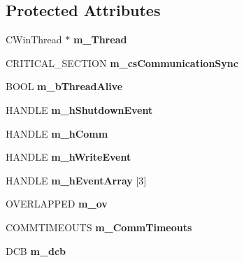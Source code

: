 \subsection*{Protected Attributes}
\begin{DoxyCompactItemize}
\item 
\hypertarget{classCSerialPort_a3c2fe60cefc3c0e14638c132c313bc42}{
CWinThread $\ast$ {\bfseries m\_\-Thread}}
\label{classCSerialPort_a3c2fe60cefc3c0e14638c132c313bc42}

\item 
\hypertarget{classCSerialPort_a3df14df19d8f6f09d803bee2ec0ab25e}{
CRITICAL\_\-SECTION {\bfseries m\_\-csCommunicationSync}}
\label{classCSerialPort_a3df14df19d8f6f09d803bee2ec0ab25e}

\item 
\hypertarget{classCSerialPort_a33f11e4d656ace95dba8f4e8e5890f9f}{
BOOL {\bfseries m\_\-bThreadAlive}}
\label{classCSerialPort_a33f11e4d656ace95dba8f4e8e5890f9f}

\item 
\hypertarget{classCSerialPort_a7f19c5462fef05e6182ab2af9b1a2da2}{
HANDLE {\bfseries m\_\-hShutdownEvent}}
\label{classCSerialPort_a7f19c5462fef05e6182ab2af9b1a2da2}

\item 
\hypertarget{classCSerialPort_a234faffa92379fada3f91ce21a8cac35}{
HANDLE {\bfseries m\_\-hComm}}
\label{classCSerialPort_a234faffa92379fada3f91ce21a8cac35}

\item 
\hypertarget{classCSerialPort_a2a4e02de15cc82cb41f9660c9af203ed}{
HANDLE {\bfseries m\_\-hWriteEvent}}
\label{classCSerialPort_a2a4e02de15cc82cb41f9660c9af203ed}

\item 
\hypertarget{classCSerialPort_adc1530502ba6dde3a9352141077b5afa}{
HANDLE {\bfseries m\_\-hEventArray} \mbox{[}3\mbox{]}}
\label{classCSerialPort_adc1530502ba6dde3a9352141077b5afa}

\item 
\hypertarget{classCSerialPort_a5fe58c691b790d9e5d33c454411814fe}{
OVERLAPPED {\bfseries m\_\-ov}}
\label{classCSerialPort_a5fe58c691b790d9e5d33c454411814fe}

\item 
\hypertarget{classCSerialPort_a73604d37bb19ac73d6fe1ecacd4bb458}{
COMMTIMEOUTS {\bfseries m\_\-CommTimeouts}}
\label{classCSerialPort_a73604d37bb19ac73d6fe1ecacd4bb458}

\item 
\hypertarget{classCSerialPort_acf13f9a229e3693a1eae6b24e72c152c}{
DCB {\bfseries m\_\-dcb}}
\label{classCSerialPort_acf13f9a229e3693a1eae6b24e72c152c}


\end{DoxyCompactItemize}
